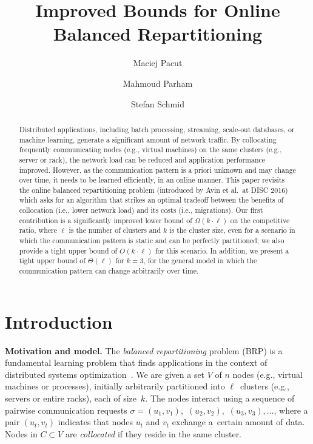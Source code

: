 \documentclass[manuscript,screen=true, review, anonymous]{acmart}
\title{Improved Bounds for Online Balanced Repartitioning}
\author{Maciej Pacut}
\affiliation{%
  \institution{Faculty of Computer Science, University of Vienna}
  \country{Austria}
}
\author{Mahmoud Parham}
\affiliation{%
  \institution{Faculty of Computer Science, University of Vienna}
  \country{Austria}
}
\author{Stefan Schmid}
\affiliation{%
  \institution{Faculty of Computer Science, University of Vienna}
  \country{Austria}
}
\newcommand{\OBRP}{BRP}
\begin{document}
\begin{abstract}
Distributed   applications,  including  batch  processing, streaming, scale-out databases,
or machine learning, generate a significant amount of network traffic. By collocating frequently communicating nodes (e.g., virtual machines) on the same clusters (e.g., server or rack), the network load can be reduced and application performance improved. 
However, as the communication pattern is a priori unknown and may change over time, it needs to be learned efficiently, in an online manner.
%
This paper revisits the online 
balanced repartitioning problem 
(introduced by Avin et al.~at DISC 2016)
which asks for an algorithm that strikes
an optimal tradeoff between the benefits
of collocation (i.e., lower network load) 
and its costs (i.e., migrations). 
%
Our first contribution is a significantly improved
lower bound of $\Omega(k\cdot \ell)$ on the
competitive ratio, where $\ell$ is the number
of clusters and $k$ is the cluster size,
even for a scenario in which the communication
pattern is static and can be perfectly partitioned;
we also provide a tight upper bound 
of $O(k\cdot \ell)$ for this scenario.
In addition, we present a tight upper bound
of $\Theta(\ell)$ for $k=3$,
for the general model in which the
communication pattern can change arbitrarily
over time. 
\end{abstract}
    
\maketitle
    
\renewcommand{\shortauthors}{M.~Pacut, M.~Parham, S.~Schmid}

\section{Introduction}


\noindent \textbf{Motivation and model.}
The \emph{balanced repartitioning} problem (\OBRP{})
is a fundamental learning problem
that finds applications in the context of
distributed systems optimization~\cite{repartition-disc}. We are given a set $V$ of $n$ nodes 
(e.g., virtual machines or processes),
initially arbitrarily partitioned into $\ell$~clusters
(e.g., servers or entire racks),
each of size~$k$.
The nodes interact using
a sequence of pairwise communication requests
$\sigma = (u_1,v_1),$ $(u_2,v_2),$ $(u_3,v_3), \ldots$,
where a pair $(u_t,v_t)$ indicates that nodes $u_t$ and $v_t$ exchange a~certain amount of data.
Nodes in $C \subset V$ are \emph{collocated}
if they reside in the same cluster.
\end{document}
